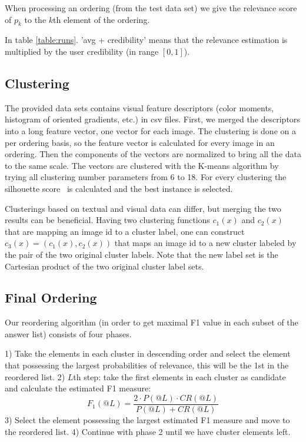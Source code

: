 \documentclass{acm_proc_article-me}
\begin{document}
When processing an ordering (from the test data set) we give the relevance score of $p_k$ to the $k$th element of the ordering.

In table \ref{table:runs}. 'avg + credibility' means that the relevance estimation is multiplied by the user credibility (in range $[0,1]$). 

\subsection{Clustering}
\label{sec:clust}

The provided data sets contains visual feature descriptors (color moments, histogram of oriented gradients, etc.) in csv files. First, we merged the descriptors into a long feature vector, one vector for each image. The clustering is done on a per ordering basis, so the feature vector is calculated for every image in an ordering. Then the components of the vectors are normalized to bring all the data to the same scale. The vectors are clustered with the K-means algorithm by trying all clustering number parameters from 6 to 18. For every clustering the silhouette score~\cite{rousseeuw1987silhouettes} is calculated and the best instance is selected.

Clusterings based on textual and visual data can differ, but merging the two results can be beneficial. Having two clustering functions $c_1(x)$ and $c_2(x)$ that are mapping an image id to a cluster label, one can construct $c_3(x) = (c_1(x), c_2(x))$ that maps an image id to a new cluster labeled by the pair of the two original cluster labels. Note that the new label set is the Cartesian product of the two original cluster label sets.

\subsection{Final Ordering}

Our reordering algorithm (in order to get maximal F1 value in each subset of the answer list) consists of four phases.

1) Take the elements in each cluster in descending order and select the element that possessing the largest probabilities of relevance, this will be the 1st in the reordered list.
2) $L$th step: take the first elements in each cluster as candidate and calculate the estimated F1 measure: $$F_1(@L) = \frac{2 \cdot P(@L) \cdot CR(@L)}{P(@L) + CR(@L)}$$
3) Select the element possessing the largest estimated F1 measure and move to the reordered list.
4) Continue with phase 2 until we have cluster elements left.
\end{document}
